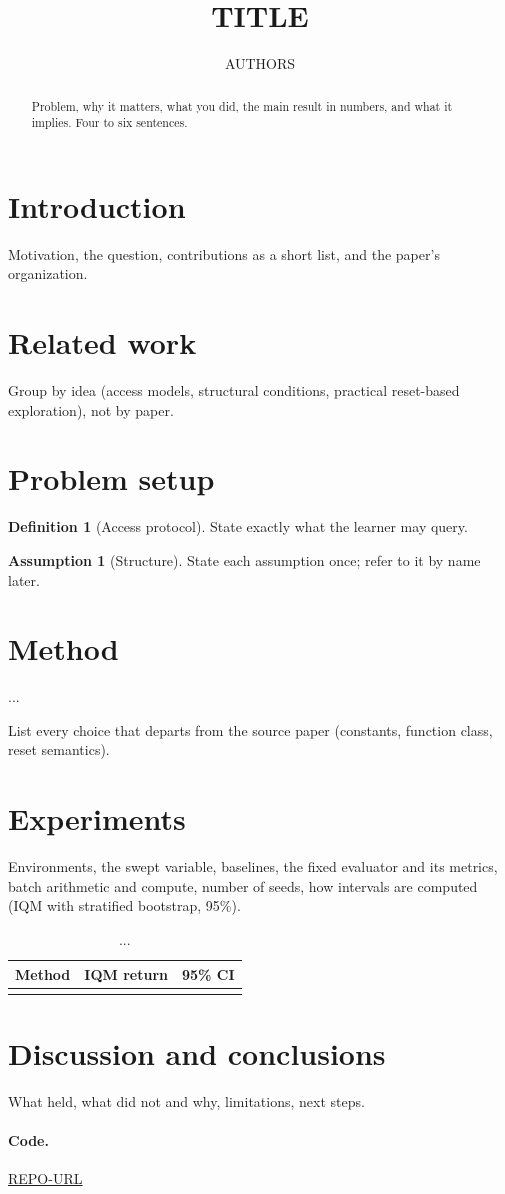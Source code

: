 \documentclass[11pt]{article}
\title{TITLE}
\author{AUTHORS}
\date{}
\theoremstyle{definition}
\newtheorem{definition}{Definition}
\newtheorem{assumption}{Assumption}
\theoremstyle{remark}
\begin{document}
\maketitle

\begin{abstract}
Problem, why it matters, what you did, the main result in numbers, and what it implies. Four to six sentences.
\end{abstract}

\section{Introduction}
Motivation, the question, contributions as a short list, and the paper's organization.

\section{Related work}
Group by idea (access models, structural conditions, practical reset-based exploration), not by paper.

\section{Problem setup}
\begin{definition}[Access protocol]
State exactly what the learner may query.
\end{definition}
\begin{assumption}[Structure]
State each assumption once; refer to it by name later.
\end{assumption}

\section{Method}
\begin{algorithm}[t]
\caption{METHOD}
...
\end{algorithm}
List every choice that departs from the source paper (constants, function class, reset semantics).

\section{Experiments}
Environments, the swept variable, baselines, the fixed evaluator and its metrics, batch arithmetic and compute, number of seeds, how intervals are computed (IQM with stratified bootstrap, 95\%).
\begin{table}[t]\centering
\begin{tabular}{lcc}\toprule
Method & IQM return & 95\% CI \\ \midrule
 & & \\ \bottomrule
\end{tabular}
\caption{...}
\end{table}

\section{Discussion and conclusions}
What held, what did not and why, limitations, next steps.

\paragraph{Code.} \url{REPO-URL}



\end{document}
